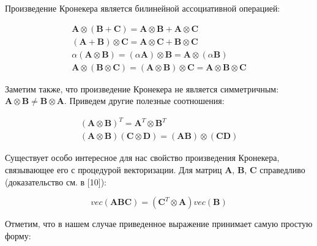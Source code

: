 Произведение Кронекера является билинейной ассоциативной операцией:

\begin{gather}
     \mathbf{A} \otimes (\mathbf{B} + \mathbf{C}) = \mathbf{A} \otimes \mathbf{B} + \mathbf{A} \otimes \mathbf{C} \\
    (\mathbf{A} + \mathbf{B}) \otimes \mathbf{C} = \mathbf{A} \otimes \mathbf{C} + \mathbf{B} \otimes \mathbf{C} \\
    \alpha(\mathbf{A} \otimes \mathbf{B}) = (\alpha\mathbf{A}) \otimes \mathbf{B} = \mathbf{A} \otimes (\alpha\mathbf{B}) \\
    \mathbf{A} \otimes(\mathbf{B} \otimes \mathbf{C}) =
   (\mathbf{A} \otimes \mathbf{B})\otimes \mathbf{C} =
    \mathbf{A} \otimes \mathbf{B} \otimes \mathbf{C}
\end{gather}

Заметим также, что произведение Кронекера не является симметричным: $\mathbf{A} \otimes \mathbf{B} \neq \mathbf{B} \otimes \mathbf{A}$.
Приведем другие полезные соотношения:

\begin{gather}
    (\mathbf{A} \otimes \mathbf{B})^T = \mathbf{A}^T \otimes \mathbf{B}^T \\
    (\mathbf{A} \otimes \mathbf{B}) (\mathbf{C} \otimes \mathbf{D}) = (\mathbf{A} \mathbf{B}) \otimes (\mathbf{C} \mathbf{D})
\end{gather}

Существует особо интересное для нас свойство произведения Кронекера, связывающее его с процедурой векторизации.
Для матриц $\mathbf{A}$, $\mathbf{B}$, $\mathbf{C}$ справедливо (доказательство см. в [10]):

\begin{equation}
    vec(\mathbf{A} \mathbf{B} \mathbf{C}) = (\mathbf{C}^T \otimes \mathbf{A}) vec(\mathbf{B})
    \label{eq:kron_vec}
\end{equation}

Отметим, что в нашем случае приведенное выражение принимает самую простую форму:

